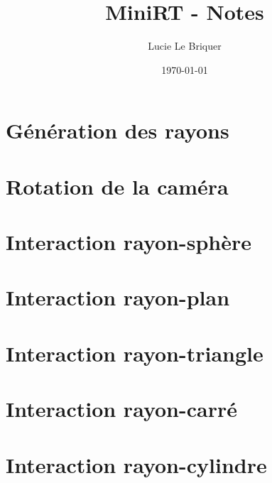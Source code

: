 

\title{\LARGE \textbf{MiniRT} - Notes}
\author{\large Lucie Le Briquer}
\date{\today}


\maketitle
\tableofcontents
\newpage
\section{Génération des rayons}
\newpage
\section{Rotation de la caméra}
\newpage
\section{Interaction rayon-sphère}
\newpage
\section{Interaction rayon-plan}
\newpage
\section{Interaction rayon-triangle}
\newpage
\section{Interaction rayon-carré}
\newpage
\section{Interaction rayon-cylindre}


